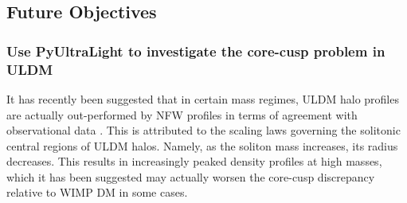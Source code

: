 \subsection{Future Objectives}

\subsubsection{Use PyUltraLight to investigate the core-cusp problem in ULDM}

It has recently been suggested that in certain mass regimes, ULDM halo profiles are actually out-performed by NFW profiles in terms of agreement with observational data \cite{Robles:2018fur}. This is attributed to the scaling laws governing the solitonic central regions of ULDM halos. Namely, as the soliton mass increases, its radius decreases. This results in increasingly peaked density profiles at high masses, which it has been suggested may actually worsen the core-cusp discrepancy relative to WIMP DM in some cases. 

